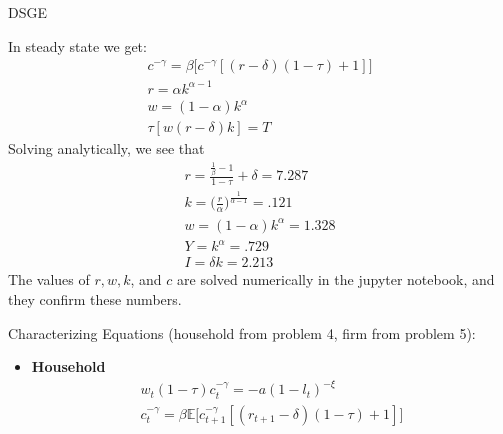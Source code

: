 \documentclass[12pt]{article}
\newenvironment{problem}[2][Problem]{\begin{trivlist}
\item[\hskip \labelsep {\bfseries #1}\hskip \labelsep {\bfseries #2.}]}{\end{trivlist}}
\theoremstyle{definition}
\theoremstyle{definition}
\theoremstyle{definition}
\theoremstyle{definition}
\begin{document}
\begin{section}{DSGE}
\begin{problem}{5}
\begin{itemize}
\end{itemize}
In steady state we get:
\begin{align}
c^{-\gamma} = \beta \big[ c^{-\gamma}[(r-\delta)(1-\tau)+1] \big] \\
r = \alpha k^{\alpha - 1} \\
w = (1 - \alpha)  k^\alpha \\
\tau[w(r - \delta)k] = T
\end{align}
Solving analytically, we see that 
\begin{align}
r = \frac{\frac{1}{\beta} - 1}{1 - \tau} + \delta = 7.287 \\
k = \Big( \frac{r}{\alpha} \Big)^{\frac{1}{\alpha - 1}} = .121 \\
w = (1 - \alpha) k^\alpha = 1.328 \\
Y = k^\alpha = .729 \\
I = \delta k = 2.213
\end{align}
The values of $r, w, k$, and $c$ are solved numerically in the jupyter notebook, and they confirm these numbers.
\end{problem}

\begin{problem}{6} Characterizing Equations (household from problem 4, firm from problem 5):
\begin{itemize}
\item \textbf{Household}
\begin{align}
w_t(1-\tau)c_t^{-\gamma} = -a(1-l_t)^{-\xi} \\
c_t^{-\gamma} = \beta \mathbb{E} \big[ c_{t+1}^{-\gamma}[(r_{t+1}-\delta)(1-\tau) +1] \big] 
\end{align}


\end{itemize}
\end{problem}
\end{section}
\end{document}
